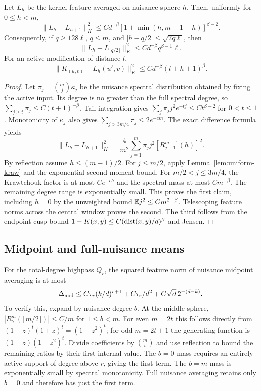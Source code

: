 \begin{lemma}\label{lem:radial-increments}
Let $L_h$ be the kernel feature averaged on nuisance sphere $h$.
Then, uniformly for $0\le h<m$,
\[
 \|L_h-L_{h+1}\|_K^2\le Cd^{-\beta}
        [1+\min(h,m-1-h)]^{\beta-2}.
\]
Consequently, if $q\ge128\ell$, $q\le m$, and
$|h-q/2|\le\sqrt{2q\ell}$, then
\[
 \|L_h-L_{\lfloor q/2\rfloor}\|_K^2
          \le Cd^{-\beta}q^{\beta-1}\ell.
\]
For an active modification of distance $l$,
\[
 \|K_{(u,v)}-L_h(u',v)\|_K^2
              \le Cd^{-\beta}(l+h+1)^\beta.
\]
\end{lemma}
\begin{proof}
Let $\pi_j=\binom mj\kappa_j$ be the nuisance spectral distribution
obtained by fixing the active input. Its degree is no greater than the
full spectral degree, so $\sum_{j\ge t}\pi_j\le C(t+1)^{-\beta}$.
Tail integration gives
$\sum_j\pi_jj^2e^{-tj}\le Ct^{\beta-2}$ for $0<t\le1$.
Monotonicity of $\kappa_j$ also gives
$\sum_{j>3m/4}\pi_j\le2e^{-cm}$.
The exact difference formula yields
\[
 \|L_h-L_{h+1}\|_K^2
 =\frac4{m^2}\sum_{j=1}^m\pi_jj^2
                      [R_{j-1}^{m-1}(h)]^2.
\]
By reflection assume $h\le(m-1)/2$. For $j\le m/2$, apply
Lemma~\ref{lem:uniform-kraw} and the exponential second-moment bound.
For $m/2<j\le3m/4$, the Krawtchouk factor is at most $Ce^{-ch}$ and
the spectral mass at most $Cm^{-\beta}$. The remaining degree range
is exponentially small. This proves the first claim, including $h=0$
by the unweighted bound $\mathbb E j^2\le Cm^{2-\beta}$.
Telescoping feature norms across the central window proves the second.
The third follows from the endpoint cusp bound
$1-K(x,y)\le C(\operatorname{dist}(x,y)/d)^\beta$ and Jensen.
\end{proof}

\subsection{Midpoint and full-nuisance means}
For the total-degree highpass $Q_r$, the squared feature norm of nuisance
midpoint averaging is at most
\begin{equation}\label{eq:midpoint-trace}
 \Delta_{\rm mid}\le
 C\tau_r(k/d)^{r+1}+C\tau_r/d^2+C\sqrt d\,2^{-(d-k)}.
\end{equation}
To verify this, expand by nuisance degree $b$. At the middle sphere,
$|R_b^m(\lfloor m/2\rfloor)|\le C/m$ for $1\le b<m$.
For even $m=2t$ this follows directly from
$(1-z)^t(1+z)^t=(1-z^2)^t$; for odd $m=2t+1$ the generating function
is $(1+z)(1-z^2)^t$. Divide coefficients by $\binom mb$ and use
reflection to bound the remaining ratios by their first internal value.
The $b=0$ mass requires an entirely active support of degree above $r$,
giving the first term. The $b=m$ mass is exponentially small by spectral
monotonicity. Full nuisance averaging retains only $b=0$ and therefore
has just the first term.

